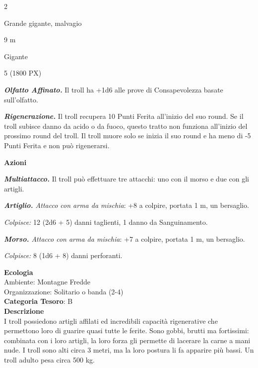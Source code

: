 \begin{multicols}{2}
{
\begin{description}[noitemsep, topsep=0pt, parsep=0pt, partopsep=0pt, itemsep=1pt, leftmargin=2.35cm,  labelwidth=2.2cm, itemindent=0cm, listparindent=0pt] %
\setlength{\baselineskip}{10pt}
\item[\textbf{Taglia/Tipo}] Grande gigante, malvagio
\item[\textbf{Caratt.}] 
\item[\textbf{Punti Ferita}] 
\item[\textbf{Movimento}] 9 m
\item[\textbf{Tiri Salvez.}] 
\item[\textbf{Sensi}] 
\item[\textbf{Linguaggi}] Gigante
\item[\textbf{Sfida}] 5 (1800 PX)
\end{description}
\smallskip

\emph{\textbf{Olfatto Affinato.}} Il troll ha +1d6 alle prove di Consapevolezza basate sull'olfatto.

\emph{\textbf{Rigenerazione.}} Il troll recupera 10 Punti Ferita all'inizio del suo round. Se il troll subisce danno da acido o da fuoco, questo tratto non funziona all'inizio del prossimo round del troll. Il troll muore solo se inizia il suo round e ha meno di -5 Punti Ferita e non può rigenerarsi.

\textbf{Azioni}

\emph{\textbf{Multiattacco.}} Il troll può effettuare tre attacchi: uno con il morso e due con gli artigli.

\emph{\textbf{Artiglio.} Attacco con arma da mischia}: +8 a colpire, portata 1 m, un bersaglio.

\emph{Colpisce:} 12 (2d6 + 5) danni taglienti, 1 danno da Sanguinamento.

\emph{\textbf{Morso.} Attacco con arma da mischia}: +7 a colpire, portata 1 m, un bersaglio.

\emph{Colpisce:} 8 (1d6 + 8) danni perforanti.

\textbf{Ecologia}\\
Ambiente: Montagne Fredde\\
Organizzazione: Solitario o banda (2-4)\\
\textbf{Categoria Tesoro}: B\\
\textbf{Descrizione}\\
I troll possiedono artigli affilati ed incredibili capacità rigenerative che permettono loro di guarire quasi tutte le ferite. Sono gobbi, brutti ma fortissimi: combinata con i loro artigli, la loro forza gli permette di lacerare la carne a mani nude. I troll sono alti circa 3 metri, ma la loro postura li fa apparire più bassi. Un troll adulto pesa circa 500 kg.

}
\end{multicols}
